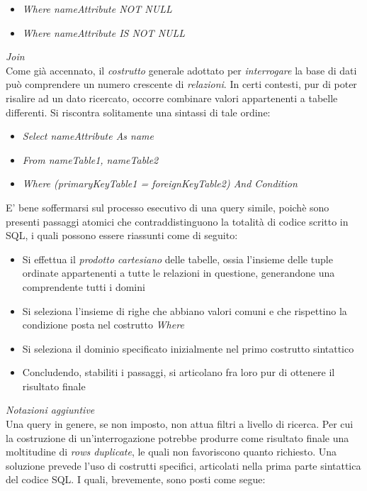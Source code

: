 \documentclass{article}
\begin{document}
\begin{itemize}[label={ }, leftmargin=1cm]
    \itemsep0em
    \item \textit{Where nameAttribute NOT NULL}
    \item \textit{Where nameAttribute IS NOT NULL}
\end{itemize} 
\textit{Join}\\
Come già accennato, il \textit{costrutto} generale adottato per \textit{interrogare} la base di dati può comprendere un numero crescente di \textit{relazioni}. In certi contesti, pur di poter risalire ad un dato ricercato, occorre combinare valori appartenenti a tabelle differenti. Si riscontra solitamente una sintassi di tale ordine:
\begin{itemize}[label={ }, leftmargin=1cm]
    \itemsep0em
    \item \textit{Select nameAttribute As name}
    \item \textit{From nameTable1, nameTable2}
    \item \textit{Where (primaryKeyTable1 = foreignKeyTable2) And Condition}
\end{itemize} 
E' bene soffermarsi sul processo esecutivo di una query simile, poichè sono presenti passaggi atomici che contraddistinguono la totalità di codice scritto in SQL, i quali possono essere riassunti come di seguito:
\begin{itemize}[label={-}, leftmargin=1cm]
    \itemsep0em
    \item Si effettua il \textit{prodotto cartesiano} delle tabelle, ossia l'insieme delle tuple ordinate appartenenti a tutte le relazioni in questione, generandone una comprendente tutti i domini
    \item Si seleziona l'insieme di righe che abbiano valori comuni e che rispettino la condizione  posta nel costrutto \textit{Where}
    \item Si seleziona il dominio specificato inizialmente nel primo costrutto sintattico
    \item Concludendo, stabiliti i passaggi, si articolano fra loro pur di ottenere il risultato finale 
\end{itemize}
\textit{Notazioni aggiuntive}\\
Una query in genere, se non imposto, non attua filtri a livello di ricerca. Per cui la costruzione di un'interrogazione potrebbe produrre come risultato finale una moltitudine di \textit{rows duplicate}, le quali non favoriscono quanto richiesto. Una soluzione prevede l'uso di costrutti specifici, articolati nella prima parte sintattica del codice SQL. I quali, brevemente, sono posti come segue:
\end{document}
